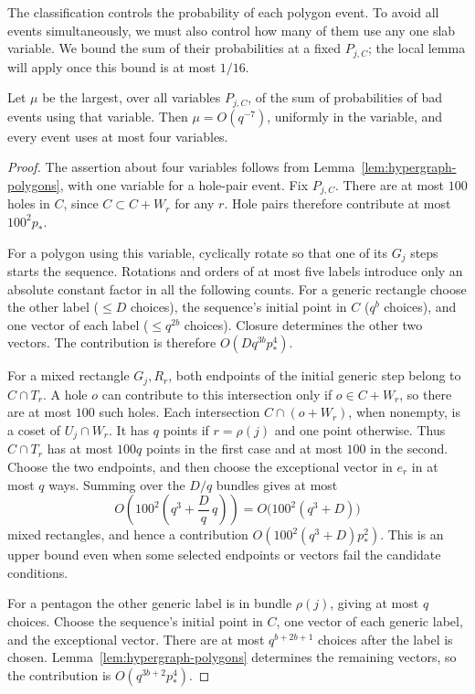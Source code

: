 The classification controls the probability of each polygon event. To
avoid all events simultaneously, we must also control how many of them
use any one slab variable. We bound the sum of their probabilities at
a fixed $P_{j,C}$; the local lemma will apply once this bound is at most
$1/16$.

\begin{lemma}\label{lem:hypergraph-event-bounds}
Let $\mu$ be the largest, over all variables $P_{j,C}$, of the sum
of probabilities of bad events using that variable.  Then
$\mu=O(q^{-7})$, uniformly in the variable, and every event uses
at most four variables.
\end{lemma}

\begin{proof}
The assertion about four variables follows from
Lemma~\ref{lem:hypergraph-polygons}, with one variable for a hole-pair
event.  Fix $P_{j,C}$.  There are at most $100$ holes in $C$, since
$C\subset C+W_r$ for any $r$.  Hole pairs therefore contribute at most
$100^2p_*$.

For a polygon using this variable, cyclically rotate so that one of
its $G_j$ steps starts the sequence.  Rotations and orders of at most
five labels introduce only an absolute constant factor in all the
following counts.  For a generic rectangle choose the other label
($\le D$ choices), the sequence's initial point in $C$ ($q^b$ choices), and
one vector of each label ($\le q^{2b}$ choices).  Closure determines
the other two vectors.  The contribution is therefore
$O(Dq^{3b}p_*^4)$.

For a mixed rectangle $G_j,R_r$, both endpoints of the initial
generic step belong to $C\cap T_r$.  A hole $o$ can contribute to
this intersection only if $o\in C+W_r$, so there are at most $100$
such holes.  Each intersection $C\cap(o+W_r)$, when nonempty, is
a coset of $U_j\cap W_r$.  It has $q$ points if $r=\rho(j)$ and one
point otherwise. Thus $C\cap T_r$ has at most $100q$ points in the
first case and at most $100$ in the second. Choose the two endpoints,
and then choose the
exceptional vector in $e_r$ in at most $q$ ways.  Summing over the
$D/q$ bundles gives at most
\[
 O\left(100^2\left(q^3+\frac Dq\,q\right)\right)
   =O\bigl(100^2(q^3+D)\bigr)
\]
mixed rectangles, and hence a contribution
$O(100^2(q^3+D)p_*^2)$.  This is an upper bound even when some
selected endpoints or vectors fail the candidate conditions.

For a pentagon the other generic label is in bundle $\rho(j)$,
giving at most $q$ choices.  Choose the sequence's initial point in $C$,
one vector of each generic label, and the exceptional vector.
There are at most $q^{b+2b+1}$ choices after the label is chosen.
Lemma~\ref{lem:hypergraph-polygons} determines the remaining vectors,
so the contribution is $O(q^{3b+2}p_*^4)$.


\end{proof}
